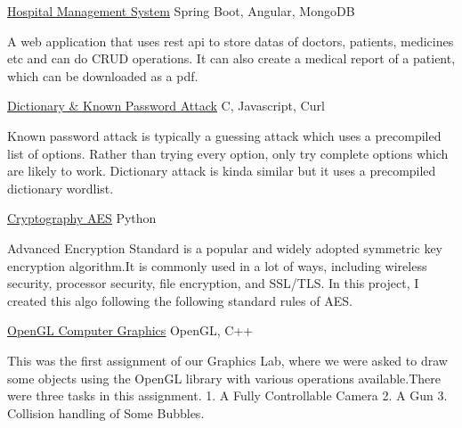 \documentclass[]{awesome-cv}
\begin{document}
\vspace{-2mm}
\begin{cventries}
	\cventry
	{}
	{\href{https://github.com/minhaz725/Hospital-Management-System}{\underline{Hospital Management System}}}
	{Spring Boot, Angular, MongoDB}
	{}
	{\begin{cvitems}
			\item {A web application that uses rest api to store datas of doctors, patients, medicines etc and can do CRUD operations. It can also create a medical report of a patient, which can be downloaded as a pdf.}
	\end{cvitems}}
	
	\vspace{-5mm}
	\cventry
	{}
	{\href{https://github.com/minhaz725/Dictionary-And-Known-Password-Attack-On-A-Local-Server}{\underline{Dictionary \& Known Password Attack}}}
	{C, Javascript, Curl}
	{}
	{\begin{cvitems}
			\item {Known password attack is typically a guessing attack which uses a precompiled list of options. Rather than trying every option, only try complete options which are likely to work. Dictionary attack is kinda similar but it uses a precompiled dictionary wordlist.}
	\end{cvitems}}
	
	
	\vspace{-5mm}
	\cventry
	{}
	{\href{https://github.com/minhaz725/Cryptography-AES}{\underline{Cryptography AES}}}
	{Python}
	{}
	{\begin{cvitems}
			\item {Advanced Encryption Standard is a popular and widely adopted symmetric key encryption algorithm.It is commonly used in a lot of ways, including wireless security, processor security, file encryption, and SSL/TLS. In this project, I created this algo following the following standard rules of AES.}
	\end{cvitems}}
	
	
	\vspace{-5mm}
	\cventry
	{}
	{\href{https://github.com/minhaz725/OpenGL-Computer-Graphics}{\underline{OpenGL Computer Graphics}}}
	{OpenGL, C++}
	{}
	{\begin{cvitems}
			\item {This was the first assignment of our Graphics Lab, where we were asked to draw some objects using the OpenGL library with various operations available.There were three tasks in this assignment.
				1. A Fully Controllable Camera
				2. A Gun
				3. Collision handling of Some Bubbles. }
	\end{cvitems}}
	

\end{cventries}
\end{document}
